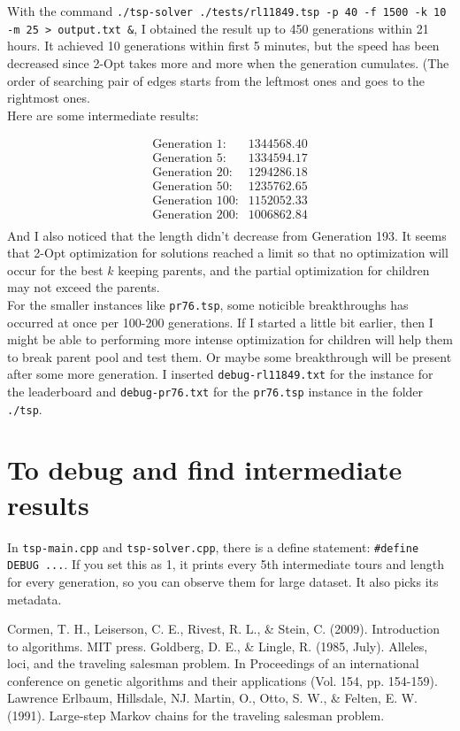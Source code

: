 \documentclass[11pt]{article}
\begin{document}
With the command \texttt{./tsp-solver ./tests/rl11849.tsp -p 40 -f 1500 -k 10 -m 25 > output.txt \&}, I obtained the result up to 450 generations within 21 hours. It achieved 10 generations within first 5 minutes, but the speed has been decreased since 2-Opt takes more and more when the generation cumulates. (The order of searching pair of edges starts from the leftmost ones and goes to the rightmost ones. \\
Here are some intermediate results:

\begin{align*}
	\text{Generation 1}:& 1344568.40 \\
	\text{Generation 5}:& 1334594.17 \\
	\text{Generation 20}:& 1294286.18 \\
	\text{Generation 50}:& 1235762.65 \\
	\text{Generation 100}:& 1152052.33 \\
	\text{Generation 200}:& 1006862.84 \\
\end{align*}
And I also noticed that the length didn't decrease from Generation 193. It seems that 2-Opt optimization for solutions reached a limit so that no optimization will occur for the best $k$ keeping parents, and the partial optimization for children may not exceed the parents. \\
For the smaller instances like \texttt{pr76.tsp}, some noticible breakthroughs has occurred at once per 100-200 generations. If I started a little bit earlier, then I might be able to performing more intense optimization for children will help them to break parent pool and test them. Or maybe some breakthrough will be present after some more generation.
I inserted \texttt{debug-rl11849.txt} for the instance for the leaderboard and \texttt{debug-pr76.txt} for the \texttt{pr76.tsp} instance in the folder \texttt{./tsp}.

\section{To debug and find intermediate results}
In \texttt{tsp-main.cpp} and \texttt{tsp-solver.cpp}, there is a define statement: \texttt{\#define DEBUG ...}. If you set this as 1, it prints every 5th intermediate tours and length for every generation, so you can observe them for large dataset. It also picks its metadata.

\begin{thebibliography}{9}
	Cormen, T. H., Leiserson, C. E., Rivest, R. L., \& Stein, C. (2009). Introduction to algorithms. MIT press.
	Goldberg, D. E., \& Lingle, R. (1985, July). Alleles, loci, and the traveling salesman problem. In Proceedings of an international conference on genetic algorithms and their applications (Vol. 154, pp. 154-159). Lawrence Erlbaum, Hillsdale, NJ.
	Martin, O., Otto, S. W., \& Felten, E. W. (1991). Large-step Markov chains for the traveling salesman problem.
\end{thebibliography}
\end{document}

